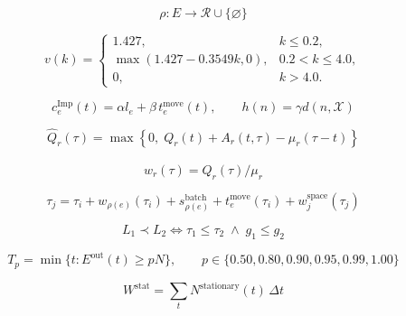
\begin{equation}
\rho:E\rightarrow\mathcal{R}\cup\{\varnothing\}
\end{equation}

\begin{equation}
v(k)=
\begin{cases}
1.427, & k\leq0.2,\\
\max(1.427-0.3549k,0), & 0.2<k\leq4.0,\\
0, & k>4.0.
\end{cases}
\end{equation}

\begin{equation}
c^{\mathrm{Imp}}_e(t)=\alpha l_e+\beta\,t^{\mathrm{move}}_e(t),
\qquad h(n)=\gamma d(n,\mathcal{X})
\end{equation}

\begin{equation}
\widehat{Q}_r(\tau)=\max\left\{0,\;Q_r(t)+A_r(t,\tau)-\mu_r(\tau-t)\right\}
\end{equation}

\begin{equation}
w_r(\tau)=\widehat{Q}_r(\tau)/\mu_r
\end{equation}

\begin{equation}
\tau_j=\tau_i+w_{\rho(e)}(\tau_i)+s^{\mathrm{batch}}_{\rho(e)}
+t^{\mathrm{move}}_e(\tau_i)+w^{\mathrm{space}}_j(\tau_j)
\end{equation}

\begin{equation}
L_1\prec L_2
\Longleftrightarrow
\tau_1\leq\tau_2\;\land\;g_1\leq g_2
\end{equation}

\begin{equation}
T_p=\min\{t:E^{\mathrm{out}}(t)\geq pN\},
\qquad p\in\{0.50,0.80,0.90,0.95,0.99,1.00\}
\end{equation}

\begin{equation}
W^{\mathrm{stat}}=\sum_t N^{\mathrm{stationary}}(t)\,\Delta t
\end{equation}
